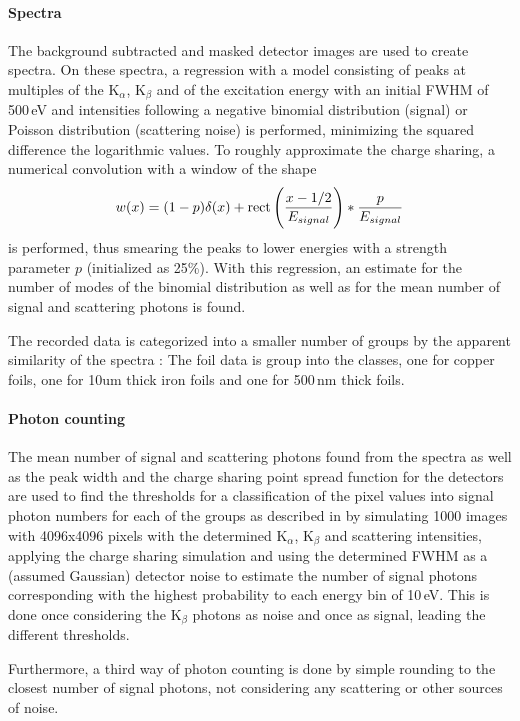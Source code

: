 \paragraph{Spectra}
The background subtracted and masked detector images are used to create spectra. On these spectra, a regression with a model consisting of peaks at multiples of the K$_\alpha$, K$_\beta$ and of the excitation energy with an initial FWHM of 500\,eV and intensities following a negative binomial distribution (signal) or Poisson distribution (scattering noise) is performed, minimizing the squared difference the logarithmic values. To roughly approximate the charge sharing, a numerical convolution with a  window of the shape
\begin{equation}
	w (x)= (1-p)\delta(x)+\operatorname{rect}\left(\frac{x-1/2}{E_{signal}}\right)*\frac{p}{E_{signal}}
\end{equation}
is performed, thus smearing the peaks to lower energies with a strength parameter $p$ (initialized as 25\%).
With this regression, an estimate for the number of modes of the binomial distribution as well as for the mean number of signal and scattering photons is found.

The recorded data is categorized into a smaller number of groups by the apparent similarity of the spectra : The foil data is group into the classes, one for copper foils, one for 10um thick iron foils and one for 500\,nm thick foils.


\paragraph{Photon counting}

The mean number of signal and scattering photons found from the spectra as well as the peak width and the  charge sharing point spread function for the detectors are used to find the thresholds for a classification of the pixel values into signal photon numbers for each of the groups as described in  by simulating 1000 images with 4096x4096 pixels with the determined K$_\alpha$, K$_\beta$ and scattering intensities, applying the charge sharing simulation and using the determined FWHM as a (assumed Gaussian) detector noise to estimate the number of signal photons corresponding with the highest probability to each energy bin of 10\,eV. This is done once  considering the K$_\beta$ photons as noise and once as signal, leading the different thresholds.

Furthermore, a third way of photon counting is done by simple rounding to the closest number of signal photons, not considering any scattering or other sources of noise. 










